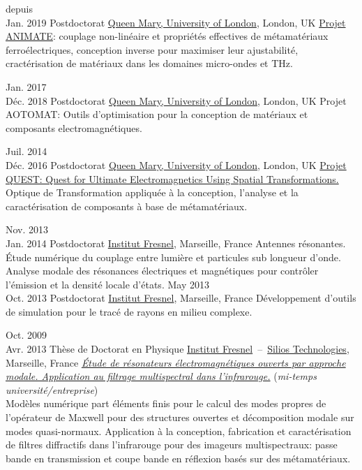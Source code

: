 \documentclass{cv}
\begin{document}
\begin{entrylist}



	\entry
	{depuis\\Jan. 2019}
	{Postdoctorat}
	{\href{http://antennas.eecs.qmul.ac.uk/}{Queen Mary, University of London}, London, UK}
	{\href{https://animate-research.com/}{Projet ANIMATE}: couplage non-linéaire et propriétés effectives de métamatériaux ferroélectriques, conception inverse pour maximiser leur ajustabilité, 
	cractérisation de matériaux dans les domaines micro-ondes et THz.
	}


	\entry
	{Jan. 2017 \\Déc. 2018}
	{Postdoctorat}
	{\href{http://antennas.eecs.qmul.ac.uk/}{Queen Mary, University of London}, London, UK}
	{Projet AOTOMAT: Outils d'optimisation pour la conception de matériaux et composants electromagnétiques.
	}

	\entry
	{Juil. 2014 \\Déc. 2016}
	{Postdoctorat}
	{\href{http://antennas.eecs.qmul.ac.uk/}{Queen Mary, University of London}, London, UK}
	{\href{http://www.quest-spatial-transformation.org/}{Projet QUEST: Quest for Ultimate Electromagnetics Using Spatial Transformations.}
	Optique de Transformation appliquée à la conception, l'analyse et la caractérisation de composants à base de métamatériaux.
	}


	\entry
	{Nov. 2013\\ Jan. 2014}
	{Postdoctorat}
	{\href{http://www.fresnel.fr/}{Institut Fresnel}, Marseille, France}
	{
	Antennes résonantes. \'Etude numérique du couplage entre lumière et particules sub longueur d'onde.
	Analyse modale des résonances électriques et magnétiques pour contrôler l'émission et la densité locale d'états.
	}
	\entry
	{May 2013 \\Oct. 2013}
	{Postdoctorat}
	{\href{http://www.fresnel.fr/}{Institut Fresnel}, Marseille, France}
	{
		Développement d'outils de simulation pour le tracé de rayons en milieu complexe.
	}

	\entry
	{Oct. 2009\\Avr. 2013}
	{Thèse de Doctorat en Physique}
	{\href{http://www.fresnel.fr/}{Institut Fresnel}~--~\href{http://www.silios.com/}{Silios Technologies}, Marseille, France}
	{\emph{\href{http://tel.archives-ouvertes.fr/index.php?halsid=slas337fv1oqlj1okgkq7q42i5&view_this_doc=tel-00918651&version=1}
			{\'Etude de résonateurs électromagnétiques ouverts par approche modale.
			Application au filtrage multispectral dans l'infrarouge.}} (\emph{mi-temps université/entreprise})\\
			Modèles numérique part éléments finis pour le calcul des modes propres de
			 l'opérateur de Maxwell pour des structures ouvertes et décomposition modale sur modes quasi-normaux.
			  Application à la conception, fabrication et caractérisation de
			  filtres diffractifs dans l'infrarouge pour des imageurs multispectraux: passe bande en
			   transmission et coupe bande en réflexion basés sur des métamatériaux.
	}

\end{entrylist}
\end{document}

